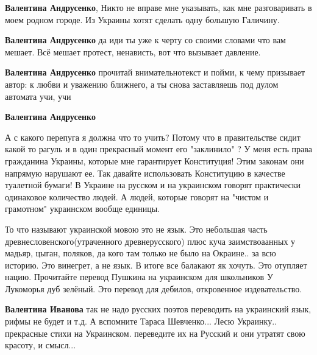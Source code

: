 \begin{itemize}
\begin{itemize}
\textbf{Валентина Андрусенко}, Никто не вправе мне указывать, как мне разговаривать в моем родном городе. Из Украины хотят сделать одну большую Галичину.

\textbf{Валентина Андрусенко} да иди ты уже к черту со своими словами что вам мешает. Всё мешает протест, ненависть, вот что вызывает давление.

\textbf{Валентина Андрусенко} прочитай внимательнотекст и пойми, к чему призывает автор: к любви и уважению ближнего, а ты снова заставляешь под дулом автомата учи, учи

\textbf{Валентина Андрусенко} 

А с какого перепуга я должна что то учить? Потому
что в правительстве сидит какой то рагуль и в один прекрасный момент его
"заклинило" ? У меня есть права гражданина Украины, которые мне гарантирует
Конституция! Этим законам они напрямую нарушают ее. Так давайте использовать
Конституцию в качестве туалетной бумаги! В Украине на русском и на украинском
говорят практически одинаковое количество людей. А людей, которые говорят на
"чистом и грамотном" украинском вообще единицы.

\end{itemize}


То что называют украинской мовою это не язык. Это небольшая часть
древнесловенского(утраченного древнерусского) плюс куча заимствоаанных у
мадьяр, цыган, поляков, да кого там только не было на Окраине.. за всю историю.
Это винегрет, а не язык. В итоге все балакают як хочуть. Это отупляет нацию.
Прочитайте перевод Пушкина на украинском для школьников У Лукоморья дуб
зелёный. Это перевод для дебилов, откровенное издевательство.

\begin{itemize}
\textbf{Валентина Иванова} так не надо русских поэтов переводить на украинский язык, рифмы не будет и т.д. А вспомните Тараса Шевченко... Лесю Украинку.. прекрасные стихи на Украинском. переведите их на Русский и они утратят свою красоту, и смысл...


\end{itemize}
\end{itemize}
